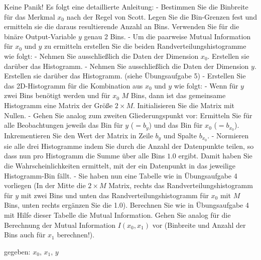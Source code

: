 \documentclass[11pt]{article}
\begin{document}
Keine Panik! Es folgt eine detaillierte Anleitung: - Bestimmen Sie die
Binbreite für das Merkmal \(x_0\) nach der Regel von Scott. Legen Sie
die Bin-Grenzen fest und ermitteln sie die daraus resultierende Anzahl
an Bins. Verwenden Sie für die binäre Output-Variable \(y\) genau 2
Bins. - Um die paarweise Mutual Information für \(x_0\) und \(y\) zu
ermitteln erstellen Sie die beiden Randverteilungshistogramme wie folgt:
- Nehmen Sie ausschließlich die Daten der Dimension \(x_0\). Erstellen
sie darüber das Histogramm. - Nehmen Sie ausschließlich die Daten der
Dimension \(y\). Erstellen sie darüber das Histogramm. (siehe
Übungsaufgabe 5) - Erstellen Sie das 2D-Histogramm für die Kombination
aus \(x_0\) und \(y\) wie folgt: - Wenn für \(y\) zwei Bins benötigt
werden und für \(x_0\) \(M\) Bins, dann ist das gemeinsame Histogramm
eine Matrix der Größe \(2 \times M\). Initialisieren Sie die Matrix mit
Nullen. - Gehen Sie analog zum zweiten Gliederungspunkt vor: Ermitteln
Sie für alle Beobachtungen jeweils das Bin für \(y\) (\(= b_y\)) und das
Bin für \(x_0\) (\(= b_{x_0}\)). Inkrementieren Sie den Wert der Matrix
in Zeile \(b_y\) und Spalte \(b_{x_0}\). - Normieren sie alle drei
Histogramme indem Sie durch die Anzahl der Datenpunkte teilen, so dass
nun pro Histogramm die Summe über alle Bins \(1.0\) ergibt. Damit haben
Sie die Wahrscheinlichkeiten ermittelt, mit der ein Datenpunkt in das
jeweilige Histogramm-Bin fällt. - Sie haben nun eine Tabelle wie in
Übungsaufgabe 4 vorliegen (In der Mitte die \(2 \times M\) Matrix,
rechts das Randverteilungshistogramm für \(y\) mit zwei Bins und unten
das Randverteilungshistogramm für \(x_0\) mit \(M\) Bins, unten rechts
ergänzen Sie die 1.0). Berechnen Sie wie in Übungsaufgabe 4 mit Hilfe
dieser Tabelle die Mutual Information. Gehen Sie analog für die
Berechnung der Mutual Information \(I(x_0, x_1)\) vor (Binbreite und
Anzahl der Bins auch für \(x_1\) berechnen!).

gegeben: \(x_0\), \(x_1\), \(y\)
\end{document}
